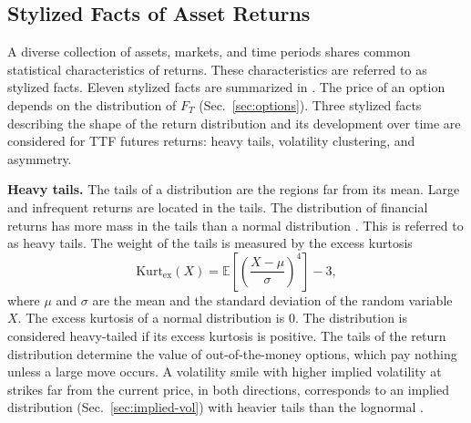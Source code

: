 
\subsection{Stylized Facts of Asset Returns}\label{sec:stylized-facts}
A diverse collection of assets, markets, and time periods shares common statistical characteristics of returns. These characteristics are referred to as stylized facts. Eleven stylized facts are summarized in \textcite{contEmpiricalPropertiesAsset2001}. 
The price of an option depends on the distribution of $F_T$ (Sec.~\ref{sec:options}). Three stylized facts describing the shape of the return distribution and its development over time are considered for TTF futures returns: heavy tails, volatility clustering, and asymmetry.

\textbf{Heavy tails.} The tails of a distribution are the regions far from its mean. Large and infrequent returns are located in the tails. The distribution of financial returns has more mass in the tails than a normal distribution \parencite{contEmpiricalPropertiesAsset2001}. This is referred to as heavy tails. The weight of the tails is measured by the excess kurtosis
\begin{equation}
    \mathrm{Kurt}_{\mathrm{ex}}(X) = \mathbb{E}\!\left[\left(\frac{X-\mu}{\sigma}\right)^{4}\right] - 3,
    \label{eq:kurtosis}
\end{equation}
where $\mu$ and $\sigma$ are the mean and the standard deviation of the random variable $X$. The excess kurtosis of a normal distribution is 0. The distribution is considered heavy-tailed if its excess kurtosis is positive. The tails of the return distribution determine the value of out-of-the-money options, which pay nothing unless a large move occurs. A volatility smile with higher implied volatility at strikes far from the current price, in both directions, corresponds to an implied distribution (Sec.~\ref{sec:implied-vol}) with heavier tails than the lognormal \parencite[453]{hullOptionsFuturesOther2022}.

